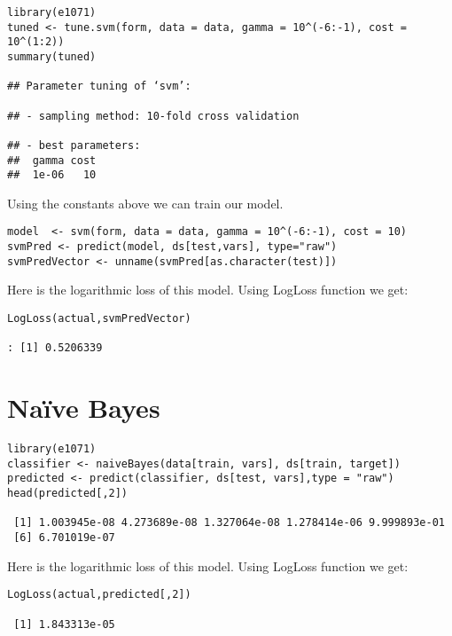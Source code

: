 \documentclass[11pt,a4paper]{article}
\begin{document}
\begin{verbatim}
library(e1071)
tuned <- tune.svm(form, data = data, gamma = 10^(-6:-1), cost = 10^(1:2))
summary(tuned)

## Parameter tuning of ‘svm’:

## - sampling method: 10-fold cross validation 

## - best parameters:
##  gamma cost
##  1e-06   10
\end{verbatim}

Using the constants above we can train our model.

\begin{verbatim}
model  <- svm(form, data = data, gamma = 10^(-6:-1), cost = 10)
svmPred <- predict(model, ds[test,vars], type="raw")
svmPredVector <- unname(svmPred[as.character(test)])
\end{verbatim}

Here is the logarithmic loss of this model.
Using LogLoss function we get:

\begin{verbatim}
LogLoss(actual,svmPredVector)

: [1] 0.5206339
\end{verbatim}
\section{Naïve Bayes}
\label{sec-6}
\begin{verbatim}
library(e1071) 
classifier <- naiveBayes(data[train, vars], ds[train, target]) 
predicted <- predict(classifier, ds[test, vars],type = "raw")
head(predicted[,2])

 [1] 1.003945e-08 4.273689e-08 1.327064e-08 1.278414e-06 9.999893e-01
 [6] 6.701019e-07
\end{verbatim}

Here is the logarithmic loss of this model.
Using LogLoss function we get:

\begin{verbatim}
LogLoss(actual,predicted[,2])

 [1] 1.843313e-05
\end{verbatim}
\end{document}
